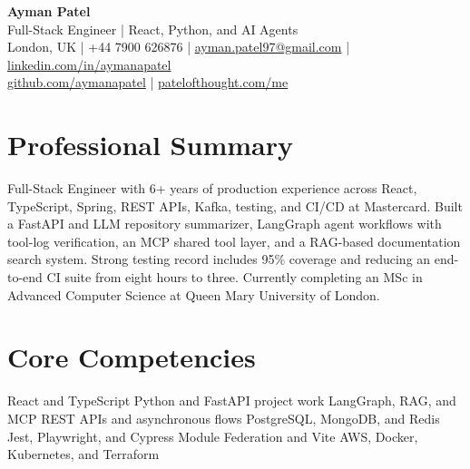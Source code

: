 \documentclass[a4paper,10pt]{article}
\begin{document}
\begin{center}
  {\LARGE \textbf{Ayman Patel}}\\
  \vspace{2pt}
  {\small Full-Stack Engineer | React, Python, and AI Agents}\\
  {\small London, UK \quad | \quad +44 7900 626876 \quad | \quad
  \href{mailto:ayman.patel97@gmail.com}{ayman.patel97@gmail.com} \quad | \quad
  \href{https://linkedin.com/in/aymanapatel}{linkedin.com/in/aymanapatel}}\\
  {\small \href{https://github.com/aymanapatel}{github.com/aymanapatel} \quad | \quad
  \href{https://patelofthought.com/me}{patelofthought.com/me}}
\end{center}

\section{Professional Summary}
{\small Full-Stack Engineer with 6+ years of production experience across React, TypeScript, Spring, REST APIs, Kafka, testing, and CI/CD at Mastercard. Built a FastAPI and LLM repository summarizer, LangGraph agent workflows with tool-log verification, an MCP shared tool layer, and a RAG-based documentation search system. Strong testing record includes 95\% coverage and reducing an end-to-end CI suite from eight hours to three. Currently completing an MSc in Advanced Computer Science at Queen Mary University of London.}

\section{Core Competencies}
{\small React and TypeScript \textbar{} Python and FastAPI project work \textbar{} LangGraph, RAG, and MCP \textbar{} REST APIs and asynchronous flows \textbar{} PostgreSQL, MongoDB, and Redis \textbar{} Jest, Playwright, and Cypress \textbar{} Module Federation and Vite \textbar{} AWS, Docker, Kubernetes, and Terraform}
\end{document}
